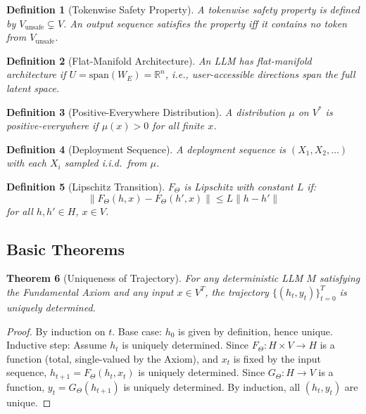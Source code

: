 \documentclass[11pt,a4paper]{article}
\newtheorem{theorem}{Theorem}[section]
\newtheorem{definition}[theorem]{Definition}
\begin{document}
\begin{definition}[Tokenwise Safety Property]
A tokenwise safety property is defined by $V_{\text{unsafe}} \subsetneq V$. An output sequence satisfies the property iff it contains no token from $V_{\text{unsafe}}$.
\end{definition}

\begin{definition}[Flat-Manifold Architecture]
An LLM has flat-manifold architecture if $U = \text{span}(W_E) = \mathbb{R}^n$, i.e., user-accessible directions span the full latent space.
\end{definition}

\begin{definition}[Positive-Everywhere Distribution]
A distribution $\mu$ on $V^*$ is positive-everywhere if $\mu(x) > 0$ for all finite $x$.
\end{definition}

\begin{definition}[Deployment Sequence]
A deployment sequence is $(X_1, X_2, \ldots)$ with each $X_i$ sampled i.i.d.\ from $\mu$.
\end{definition}

\begin{definition}[Lipschitz Transition]
$F_\Theta$ is Lipschitz with constant $L$ if:
\begin{equation}
\|F_\Theta(h, x) - F_\Theta(h', x)\| \leq L\|h - h'\|
\end{equation}
for all $h, h' \in H$, $x \in V$.
\end{definition}

\subsection{Basic Theorems}

\begin{theorem}[Uniqueness of Trajectory]
\label{thm:uniqueness}
For any deterministic LLM $M$ satisfying the Fundamental Axiom and any input $x \in V^T$, the trajectory $\{(h_t, y_t)\}_{t=0}^T$ is uniquely determined.
\end{theorem}

\begin{proof}
By induction on $t$. Base case: $h_0$ is given by definition, hence unique. Inductive step: Assume $h_t$ is uniquely determined. Since $F_\Theta: H \times V \to H$ is a function (total, single-valued by the Axiom), and $x_t$ is fixed by the input sequence, $h_{t+1} = F_\Theta(h_t, x_t)$ is uniquely determined. Since $G_\Theta: H \to V$ is a function, $y_t = G_\Theta(h_{t+1})$ is uniquely determined. By induction, all $(h_t, y_t)$ are unique.
\end{proof}
\end{document}
